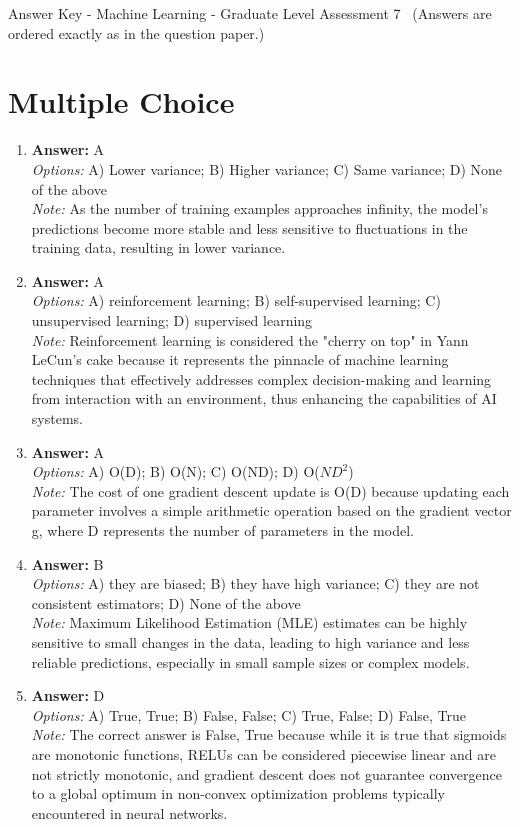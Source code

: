 \documentclass[12pt]{article}
\begin{document}
\begin{center}
Answer Key - Machine Learning - Graduate Level Assessment 7 \
\small (Answers are ordered exactly as in the question paper.)
\end{center}

\section*{Multiple Choice}
\begin{enumerate}[label=\arabic*.]
\item \textbf{Answer:} A
\\ \textit{Options:} A) Lower variance; B) Higher variance; C) Same variance; D) None of the above
\\ \textit{Note:} As the number of training examples approaches infinity, the model's predictions become more stable and less sensitive to fluctuations in the training data, resulting in lower variance.
\item \textbf{Answer:} A
\\ \textit{Options:} A) reinforcement learning; B) self-supervised learning; C) unsupervised learning; D) supervised learning
\\ \textit{Note:} Reinforcement learning is considered the "cherry on top" in Yann LeCun's cake because it represents the pinnacle of machine learning techniques that effectively addresses complex decision-making and learning from interaction with an environment, thus enhancing the capabilities of AI systems.
\item \textbf{Answer:} A
\\ \textit{Options:} A) O(D); B) O(N); C) O(ND); D) O($ND^2$)
\\ \textit{Note:} The cost of one gradient descent update is O(D) because updating each parameter involves a simple arithmetic operation based on the gradient vector g, where D represents the number of parameters in the model.
\item \textbf{Answer:} B
\\ \textit{Options:} A) they are biased; B) they have high variance; C) they are not consistent estimators; D) None of the above
\\ \textit{Note:} Maximum Likelihood Estimation (MLE) estimates can be highly sensitive to small changes in the data, leading to high variance and less reliable predictions, especially in small sample sizes or complex models.
\item \textbf{Answer:} D
\\ \textit{Options:} A) True, True; B) False, False; C) True, False; D) False, True
\\ \textit{Note:} The correct answer is False, True because while it is true that sigmoids are monotonic functions, RELUs can be considered piecewise linear and are not strictly monotonic, and gradient descent does not guarantee convergence to a global optimum in non-convex optimization problems typically encountered in neural networks.
\end{enumerate}
\end{document}
